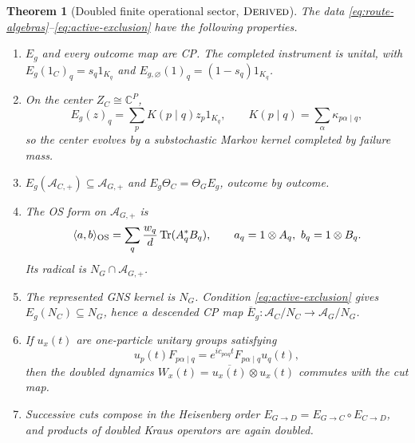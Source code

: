 \documentclass[11pt,a4paper]{article}
\newtheorem{theorem}{Theorem}[section]
\theoremstyle{definition}
\theoremstyle{remark}
\newcommand{\C}{\mathbb C}
\newcommand{\A}{\mathcal A}
\newcommand{\Tr}{\operatorname{Tr}}
\newcommand{\status}[1]{\textsc{#1}}
\begin{document}
\begin{theorem}[Doubled finite operational sector, $\status{Derived}$]
The data \eqref{eq:route-algebras}--\eqref{eq:active-exclusion} have the following
properties.

\begin{enumerate}[label=(\roman*),leftmargin=2.1em]
\item $E_g$ and every outcome map are CP.  The completed instrument is unital, with
$E_g(1_C)_q=s_q1_{K_q}$ and
$E_{g,\varnothing}(1)_q=(1-s_q)1_{K_q}$.
\item On the center $Z_C\cong\C^P$,
\begin{equation}
 E_g(z)_q=\sum_p K(p\mid q)z_p1_{K_q},\qquad
 K(p\mid q)=\sum_\alpha\kappa_{p\alpha\mid q},
 \label{eq:center-markov}
\end{equation}
so the center evolves by a substochastic Markov kernel completed by failure mass.
\item $E_g(\A_{C,+})\subseteq\A_{G,+}$ and
$E_g\Theta_C=\Theta_GE_g$, outcome by outcome.
\item The OS form on $\A_{G,+}$ is
\begin{equation}
 \langle a,b\rangle_{\rm OS}
 =\sum_q\frac{w_q}{d}\Tr(A_q^*B_q),
 \qquad a_q=1\otimes A_q,\ b_q=1\otimes B_q.
 \label{eq:fos-os}
\end{equation}
Its radical is $N_G\cap\A_{G,+}$.
\item The represented GNS kernel is $N_G$.  Condition
\eqref{eq:active-exclusion} gives $E_g(N_C)\subseteq N_G$, hence a descended CP map
$\overline E_g:\A_C/N_C\to\A_G/N_G$.
\item If $u_x(t)$ are one-particle unitary groups satisfying
\begin{equation}
 u_p(t)F_{p\alpha\mid q}
 =e^{ic_{p\alpha q}t}F_{p\alpha\mid q}u_q(t),
 \label{eq:one-particle-intertwiner}
\end{equation}
then the doubled dynamics $W_x(t)=\overline{u_x(t)}\otimes u_x(t)$ commutes with the cut
map.
\item Successive cuts compose in the Heisenberg order
$E_{G\to D}=E_{G\to C}\circ E_{C\to D}$, and products of doubled Kraus operators are
again doubled.
\end{enumerate}
\end{theorem}
\end{document}

